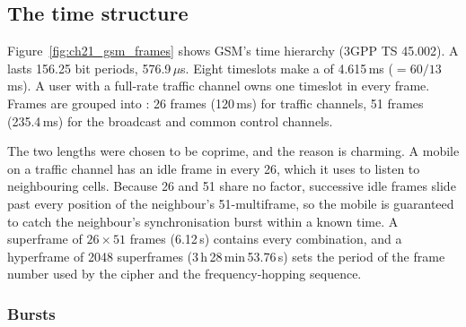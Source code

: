 \subsection{The time structure}

Figure~\ref{fig:ch21_gsm_frames} shows GSM's time hierarchy (3GPP TS 45.002). A 
lasts 156.25 bit periods, 576.9\,$\mu$s. Eight timeslots make a  of 4.615\,ms
($=60/13$\,ms). A user with a full-rate traffic channel owns one timeslot in every frame. Frames
are grouped into : 26 frames (120\,ms) for traffic channels, 51 frames
(235.4\,ms) for the broadcast and common control channels.

The two lengths were chosen to be coprime, and the reason is charming. A mobile on a traffic
channel has an idle frame in every 26, which it uses to listen to neighbouring cells. Because 26 and
51 share no factor, successive idle frames slide past every position of the neighbour's
51-multiframe, so the mobile is guaranteed to catch the neighbour's synchronisation burst within a
known time. A superframe of $26\times51$ frames (6.12\,s) contains every combination, and a
hyperframe of 2048 superframes (3\,h\,28\,min\,53.76\,s) sets the period of the frame number used
by the cipher and the frequency-hopping sequence.


\subsubsection{Bursts}

